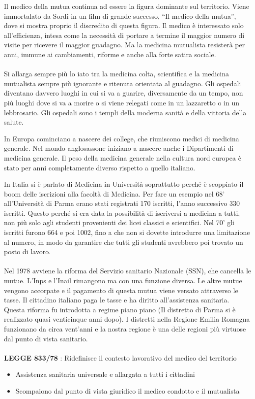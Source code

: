 Il medico della mutua continua ad essere la figura dominante sul
territorio. Viene immortalato da Sordi in un film di grande successo,
``Il medico della mutua'', dove si mostra proprio il discredito di
questa figura. Il medico è interessato solo all'efficienza, intesa come
la necessità di portare a termine il maggior numero di visite per
ricevere il maggior guadagno. Ma la medicina mutualista resisterà per
anni, immune ai cambiamenti, riforme e anche alla forte satira sociale.
\\\\
Si allarga sempre più lo iato tra la medicina colta, scientifica e la
medicina mutualista sempre più ignorante e ritenuta orientata al
guadagno. Gli ospedali diventano davvero luoghi in cui si va a guarire,
diversamente da un tempo, non più luoghi dove si va a morire o si viene
relegati come in un lazzaretto o in un lebbrosario. Gli ospedali sono i
templi della moderna sanità e della vittoria della salute.

In Europa cominciano a nascere dei college, che riuniscono medici di
medicina generale. Nel mondo anglosassone iniziano a nascere anche i
Dipartimenti di medicina generale. Il peso della medicina generale nella
cultura nord europea è stato per anni completamente diverso rispetto a
quello italiano.

In Italia si è parlato di Medicina in Università soprattutto perché è
scoppiato il boom delle iscrizioni alla facoltà di Medicina. Per fare un
esempio nel 68' all'Università di Parma erano stati registrati 170
iscritti, l'anno successivo 330 iscritti. Questo perché si era data la
possibilità di iscriversi a medicina a tutti, non più solo agli studenti
provenienti dei licei classici e scientifici. Nel 70' gli iscritti
furono 664 e poi 1002, fino a che non si dovette introdurre una
limitazione al numero, in modo da garantire che tutti gli studenti
avrebbero poi trovato un posto di lavoro.
\\\\
Nel 1978 avviene la riforma del Servizio sanitario Nazionale (SSN), che
cancella le mutue. L'Inps e l'Inail rimangono ma con una funzione
diversa. Le altre mutue vengono accorpate e il pagamento di questa mutua
viene versato attraverso le tasse. Il cittadino italiano paga le tasse e
ha diritto all'assistenza sanitaria. Questa riforma fu introdotta a
regime piano piano (Il distretto di Parma si è realizzato quasi
venticinque anni dopo). I distretti nella Regione Emilia Romagna
funzionano da circa vent'anni e la nostra regione è una delle regioni
più virtuose dal punto di vista sanitario.
\\\\
\textbf{LEGGE 833/78} : Ridefinisce il contesto lavorativo del medico del
territorio
\begin{itemize}
\item Assistenza sanitaria universale e allargata a tutti i cittadini
\item Scompaiono dal punto di vista giuridico il medico condotto e il
mutualista
\end{itemize}

